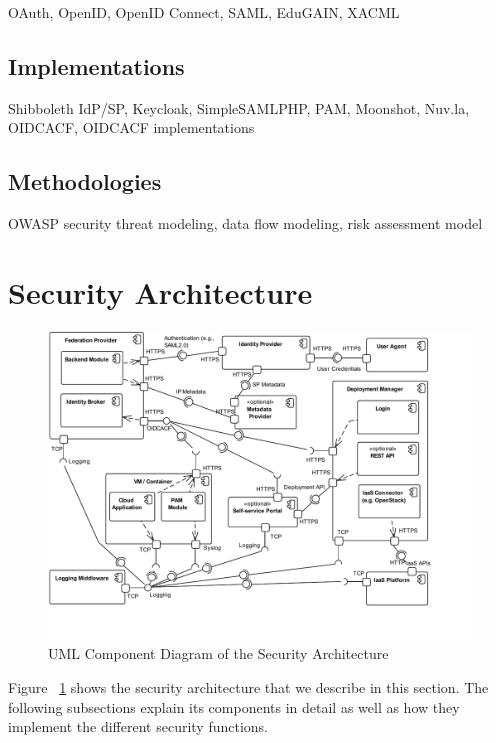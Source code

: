 \documentclass{llncs}
\begin{document}
OAuth, OpenID, OpenID Connect, SAML, EduGAIN, XACML


\subsection{Implementations}

Shibboleth IdP/SP, Keycloak, SimpleSAMLPHP, PAM, Moonshot, Nuv.la, OIDCACF, OIDCACF implementations \label{sec:oidcacfi}

\subsection{Methodologies}

OWASP security threat modeling, data flow modeling, risk assessment model

\section{Security Architecture}
\label{sec:architecture}

\begin{figure}
	\vspace*{-0.5cm}
	\centering
	\includegraphics[width=\columnwidth, clip=true, trim=0cm 1.4cm 1.8cm 0cm]{uml_components}
	\caption{UML Component Diagram of the Security Architecture}
	\label{fig:architecture}
\end{figure}

Figure ~\ref{fig:architecture} shows the security architecture that we describe in this section. The following subsections explain its components in detail as well as how they implement the different security functions.
\end{document}
